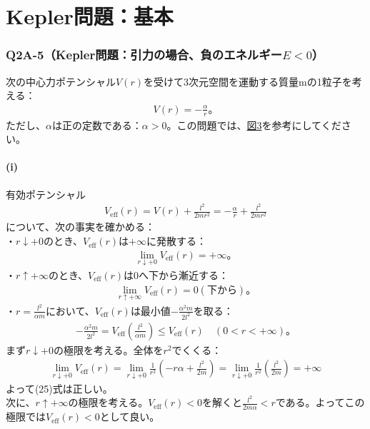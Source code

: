   \part{Kepler問題：基本}

  \section{Q2A-5（Kepler問題：引力の場合、負のエネルギー$E<0$）}
  次の中心力ポテンシャル$V(r)$を受けて3次元空間を運動する質量mの1粒子を考える：
  \begin{align*}
    V(r)=-\frac\alpha r。\tag{23}
  \end{align*}
  ただし、$\alpha$は正の定数である：$\alpha>0$。この問題では、\hyperref[fig:3]{図3}を参考にしてください。

  \subsection*{(i)}
  有効ポテンシャル
  \begin{align*}
    V_{\mathrm{eff}}(r)=V(r)+\frac{l^2}{2mr^2}=-\frac\alpha r +\frac{l^2}{2mr^2}\tag{24}
  \end{align*}
  について、次の事実を確かめる：\\
  ・$r\downarrow +0$のとき、$V_{\mathrm{eff}}(r)$は$+\infty$に発散する：
  \begin{align*}
    \lim_{r\downarrow +0}V_{\mathrm{eff}}(r)=+\infty。\tag{25}
  \end{align*}
  ・$r\uparrow+\infty$のとき、$V_{\mathrm{eff}}(r)$は0へ下から漸近する：
  \begin{align*}
    \lim_{r\uparrow +\infty}V_{\mathrm{eff}}(r)=0(下から)。\tag{26}
  \end{align*}
  ・$r=\frac{l^2}{\alpha m}$において、$V_{\mathrm{eff}}(r)$は最小値$-\frac{\alpha^2 m}{2l^2}$を取る：
  \begin{align*}
    -\frac{\alpha^2 m}{2l^2}=V_{\mathrm{eff}}(\frac{l^2}{\alpha m})\leq V_{\mathrm{eff}}(r)\quad(0<r<+\infty)。\tag{27}
  \end{align*}
  まず$r\downarrow +0$の極限を考える。全体を$r^2$でくくる：
  \begin{align*}
    \lim_{r\downarrow+0}V_{\mathrm{eff}}(r)=\lim_{r\downarrow+0}\frac{1}{r^2}\left(-r\alpha + \frac{l^2}{2m}\right)=\lim_{r\downarrow+0}\frac{1}{r^2}\left(\frac{l^2}{2m}\right)=+\infty
  \end{align*}
  よって(25)式は正しい。\\
  次に、$r\uparrow+\infty$の極限を考える。$V_{\mathrm{eff}}(r)<0$を解くと$\frac{l^2}{2m\alpha}<r$である。よってこの極限では$V_{\mathrm{eff}}(r)<0$として良い。
